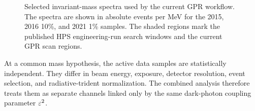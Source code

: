 

\begin{figure}[t]
\centering
{}
\caption{Selected invariant-mass spectra used by the current GPR workflow. The spectra
are shown in absolute events per MeV for the 2015, 2016 10\%, and 2021 1\% samples.
The shaded regions mark the published HPS engineering-run search windows and the
current GPR scan regions.}
\label{fig:input-spectra}
\end{figure}

At a common mass hypothesis, the active data samples are statistically independent.
They differ in beam energy, exposure, detector resolution, event selection, and
radiative-trident normalization. The combined analysis therefore treats them as
separate channels linked only by the same dark-photon coupling parameter $\varepsilon^2$.
